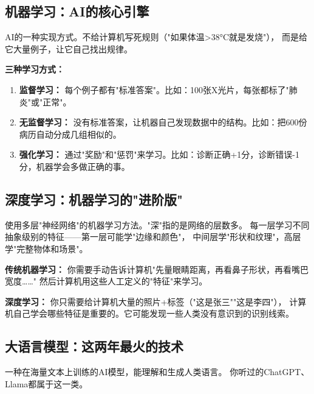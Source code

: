 \documentclass[11pt,a4paper]{ctexart}
\begin{document}
\subsection{机器学习：AI的核心引擎}

\begin{defbox}
AI的一种实现方式。不给计算机写死规则（"如果体温>38°C就是发烧"），
而是给它大量例子，让它自己找出规律。
\end{defbox}

\textbf{三种学习方式：}

\begin{enumerate}[nosep]
\item \textbf{监督学习：} 每个例子都有"标准答案"。比如：100张X光片，每张都标了"肺炎"或"正常"。
\item \textbf{无监督学习：} 没有标准答案，让机器自己发现数据中的结构。比如：把600份病历自动分成几组相似的。
\item \textbf{强化学习：} 通过"奖励"和"惩罚"来学习。比如：诊断正确+1分，诊断错误-1分，机器学会多做正确的事。
\end{enumerate}

\subsection{深度学习：机器学习的"进阶版"}

\begin{defbox}
使用多层"神经网络"的机器学习方法。"深"指的是网络的层数多。
每一层学习不同抽象级别的特征——第一层可能学"边缘和颜色"，
中间层学"形状和纹理"，高层学"完整物体和场景"。
\end{defbox}

\begin{exambox}
\textbf{传统机器学习：} 你需要手动告诉计算机"先量眼睛距离，再看鼻子形状，再看嘴巴宽度……"
然后计算机用这些人工定义的"特征"来学习。

\textbf{深度学习：} 你只需要给计算机大量的照片+标签（"这是张三""这是李四"），
计算机自己学会哪些特征是重要的。它可能发现一些人类没有意识到的识别线索。
\end{exambox}

\subsection{大语言模型：这两年最火的技术}

\begin{defbox}
一种在海量文本上训练的AI模型，能理解和生成人类语言。
你听过的ChatGPT、Llama都属于这一类。
\end{defbox}
\end{document}
